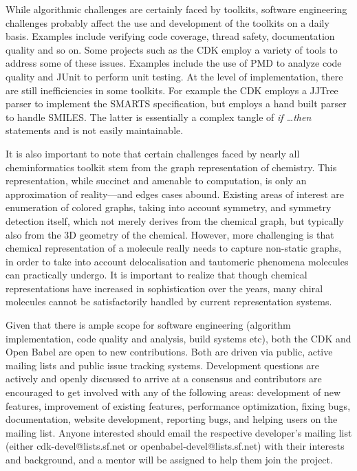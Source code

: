 \documentclass{sig-alternate}
\begin{document}
While algorithmic challenges are certainly faced by toolkits, software
engineering challenges probably affect the use and development of the
toolkits on a daily basis. Examples include verifying code coverage,
thread safety, documentation quality and so on. Some projects such as
the CDK employ a variety of tools to address some of these issues.
Examples include the use of PMD to analyze code quality and JUnit to
perform unit testing. At the level of implementation, there are still
inefficiencies in some toolkits. For example the CDK employs a JJTree
parser to implement the SMARTS specification, but employs a hand built
parser to handle SMILES. The latter is essentially a complex tangle of
\emph{if \ldots then} statements and is not easily maintainable.

It is also important to note that certain challenges faced by nearly
all cheminformatics toolkit stem from the graph representation of
chemistry. This representation, while succinct and amenable to
computation, is only an approximation of reality---and edges cases
abound. Existing areas of interest are enumeration of colored graphs,
taking into account symmetry, and symmetry detection itself, which not
merely derives from the chemical graph, but typically also from the 3D
geometry of the chemical. However, more challenging is that chemical
representation of a molecule really needs to capture non-static
graphs, in order to take into account delocalisation and tautomeric
phenomena molecules can practically undergo. It is important to
realize that though chemical representations have increased in
sophistication over the years, many chiral molecules cannot be
satisfactorily handled by current representation systems.


Given that there is ample scope for software engineering (algorithm
implementation, code quality and analysis, build systems etc), both
the CDK and Open Babel are open to new contributions. Both are driven
via public, active mailing lists and public issue tracking systems.
Development questions are actively and openly discussed to arrive at a
consensus and contributors are encouraged to get involved with any of
the following areas: development of new features, improvement of
existing features, performance optimization, fixing bugs,
documentation, website development, reporting bugs, and helping users
on the mailing list. Anyone interested should email the respective
developer's mailing list (either cdk-devel@lists.sf.net or
openbabel-devel@lists.sf.net) with their interests and background, and
a mentor will be assigned to help them join the project.
\end{document}
